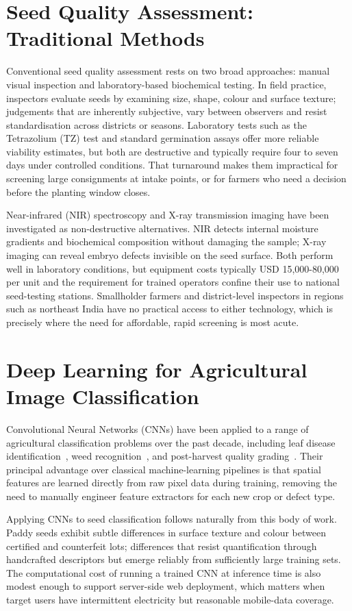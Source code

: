\section{Seed Quality Assessment: Traditional Methods}

Conventional seed quality assessment rests on two broad approaches: manual visual inspection and laboratory-based biochemical testing. In field practice, inspectors evaluate seeds by examining size, shape, colour and surface texture; judgements that are inherently subjective, vary between observers and resist standardisation across districts or seasons. Laboratory tests such as the Tetrazolium (TZ) test and standard germination assays offer more reliable viability estimates, but both are destructive and typically require four to seven days under controlled conditions. That turnaround makes them impractical for screening large consignments at intake points, or for farmers who need a decision before the planting window closes.

Near-infrared (NIR) spectroscopy and X-ray transmission imaging have been investigated as non-destructive alternatives. NIR detects internal moisture gradients and biochemical composition without damaging the sample; X-ray imaging can reveal embryo defects invisible on the seed surface. Both perform well in laboratory conditions, but equipment costs typically USD 15,000-80,000 per unit and the requirement for trained operators confine their use to national seed-testing stations. Smallholder farmers and district-level inspectors in regions such as northeast India have no practical access to either technology, which is precisely where the need for affordable, rapid screening is most acute.

\section{Deep Learning for Agricultural Image Classification}

Convolutional Neural Networks (CNNs) have been applied to a range of agricultural classification problems over the past decade, including leaf disease identification~\cite{mohanty2016plant}, weed recognition~\cite{dyrmann2016}, and post-harvest quality grading~\cite{zhang2020}. Their principal advantage over classical machine-learning pipelines is that spatial features are learned directly from raw pixel data during training, removing the need to manually engineer feature extractors for each new crop or defect type.

Applying CNNs to seed classification follows naturally from this body of work. Paddy seeds exhibit subtle differences in surface texture and colour between certified and counterfeit lots; differences that resist quantification through handcrafted descriptors but emerge reliably from sufficiently large training sets. The computational cost of running a trained CNN at inference time is also modest enough to support server-side web deployment, which matters when target users have intermittent electricity but reasonable mobile-data coverage.

